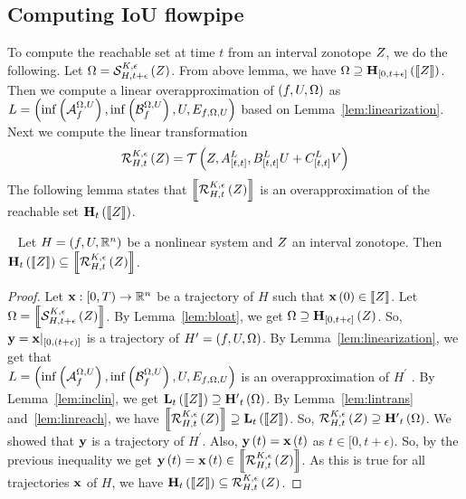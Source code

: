 \subsection{Computing IoU flowpipe}
To compute the reachable set at time $t$ from an interval zonotope
$Z$, we do the following.  Let $\Omega
= \mathcal{S}_{H,t+\epsilon}^{K,\epsilon}\left(Z\right)$.  From above lemma, we
have $\Omega\supseteq\mathbf{H}_{[0,t+\epsilon]}\left(\left\llbracket{Z}\right\rrbracket\right)$. 
Then we
compute a linear overapproximation of $\left(f,U,\Omega\right)$ as\\ $L
= \left(\inf\left(\mathcal{A}_{f}^{\Omega,U}\right),
\inf\left(\mathcal{B}_{f}^{\Omega,U}\right),
U,
E_{f,\Omega,U}
\right)$ based on Lemma~\ref{lem:linearization}.  Next we compute the linear transformation
%
\[
\mathcal{R}_{H,t}^{K,\epsilon}\left(Z\right)
= \mathcal{T}\left(Z, {A}^{L}_{[t,t]},{B}^{L}_{[t,t]}U
+ {C}^{L}_{[t,t]}V \right)
\]
%
The following lemma states that $\left\llbracket{\mathcal{R}_{H,t}^{K,\epsilon}\left(Z\right)
}\right\rrbracket$ is an overapproximation of the reachable set
$\mathbf{H}_{t}\left(\left\llbracket{Z}\right\rrbracket\right)$.
%
\begin{lemma}~\label{lem:reachnonlin}
Let $H = \left(f,U,\mathbb{R}^n\right)$ be a nonlinear system and $Z$ an
interval zonotope.  Then
$\mathbf{H}_{t}\left(\left\llbracket{Z}\right\rrbracket\right) \subseteq \left\llbracket{\mathcal{R}_{H,t}^{K,\epsilon}\left(Z\right)}\right\rrbracket$.
\end{lemma}
%
\begin{proof}
Let $\mathbf{x}:[0,T)\rightarrow \mathbb{R}^n$ be a trajectory of $H$ such
that $\mathbf{x}\left(0\right)\in\left\llbracket{Z}\right\rrbracket$.  Let $\Omega
= \left\llbracket{\mathcal{S}_{H,t+\epsilon}^{K,\epsilon}\left(Z\right)}\right\rrbracket$.  By
Lemma~\ref{lem:bloat}, we get $\Omega\supseteq\mathbf{H}_{[0,t+\epsilon]}\left(Z\right)$.  So,
$\mathbf{y} = \mathbf{x}|_{[0,(t+\epsilon)]}$ is a trajectory of $H^\prime
= \left(f,U,\Omega\right)$.  By Lemma~\ref{lem:linearization}, we get that\\ $L
= \left(\inf\left(\mathcal{A}_{f}^{\Omega,U}\right),
\inf\left(\mathcal{B}_{f}^{\Omega,U}\right),
U,
E_{f,\Omega,U}
\right)$ is an overapproximation of $H^\prime$ .  By Lemma~\ref{lem:inclin},
we get
$\mathbf{L}_{t}\left(\left\llbracket{Z}\right\rrbracket\right)\supseteq\mathbf{H^\prime}_{t}\left(\Omega\right)$.  By
Lemma~\ref{lem:lintrans} and~\ref{lem:linreach}, we have
$\left\llbracket{\mathcal{R}_{H,t}^{K,\epsilon}\left(Z\right)}\right\rrbracket \supseteq \mathbf{L}_{t}\left(\left\llbracket{Z}\right\rrbracket\right)$.
So,
$\mathcal{R}_{H,t}^{K,\epsilon}\left(Z\right)\supseteq\mathbf{H^\prime}_{t}\left(\Omega\right)$.
We showed that $\mathbf{y}$ is a trajectory of $H^\prime$. Also,
$\mathbf{y}\left(t\right) =\mathbf{x}\left(t\right)$ as $t\in[0,t+\epsilon)$.  So, by the previous
inequality we get $\mathbf{y}\left(t\right)
= \mathbf{x}\left(t\right)\in\left\llbracket{\mathcal{R}_{H,t}^{K,\epsilon}\left(Z\right)}\right\rrbracket$.  As this is true
for all trajectories $\mathbf{x}$ of $H$, we have
$\mathbf{H}_{t}\left(\left\llbracket{Z}\right\rrbracket\right)\subseteq\mathcal{R}_{H,t}^{K,\epsilon}\left(Z\right)$.
\end{proof}
